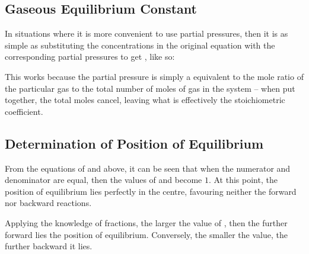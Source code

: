 		\subsection{Gaseous Equilibrium Constant \texorpdfstring{\MKp{}}{Kp}}

			In situations where it is more convenient to use partial pressures, then it is as simple as substituting the concentrations
			in the original \Kc{} equation with the corresponding partial pressures to get \Kp{}, like so:

			\txtdiagram{
				\[K_{p} = \frac{(P_{C})^{c}(P_{D})^{d}}{(P_{A})^{a}(P_{B})^{b}}\]
			}{}

			This works because the partial pressure is simply a equivalent to the mole ratio of the particular gas to the total number of
			moles of gas in the system -- when put together, the total moles cancel, leaving what is effectively the stoichiometric
			coefficient.



		\pagebreak
		\subsection{Determination of Position of Equilibrium}

			From the equations of \Kc{} and \Kp{} above, it can be seen that when the numerator and denominator are equal, then the values of
			\Kc{} and \Kp{} become $1$. At this point, the position of equilibrium lies perfectly in the centre, favouring neither the forward
			nor backward reactions.

			Applying the knowledge of fractions, the larger the value of \Kc{}, then the further forward lies the position of equilibrium.
			Conversely, the smaller the value, the further backward it lies.


